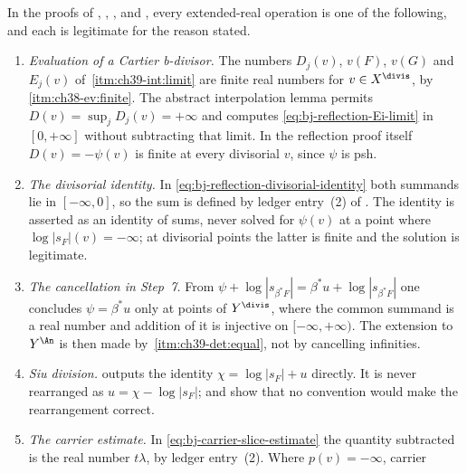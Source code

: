 \begin{proposition}
\label{prop:ch39-safeguards}
In the proofs of ,
,
,
 and
, every extended-real operation is one of
the following, and each is legitimate for the reason stated.
\begin{enumerate}
\item\label{itm:ch39-safe:eval}
 \emph{Evaluation of a Cartier b-divisor.}  The numbers $D_j(v)$,
 $v(F)$, $v(G)$ and $E_j(v)$ of
 \,\cref{itm:ch39-int:limit} are finite real
 numbers for $v\in X^{\divis}$, by
 \,\cref{itm:ch38-ev:finite}.  The abstract
 interpolation lemma permits $D(v)=\sup_jD_j(v)=+\infty$ and computes
 \eqref{eq:bj-reflection-Ei-limit} in $[0,+\infty]$ without subtracting
 that limit.  In the reflection proof itself $D(v)=-\psi(v)$ is finite
 at every divisorial $v$, since $\psi$ is psh.
\item\label{itm:ch39-safe:sum}
 \emph{The divisorial identity.}  In
 \eqref{eq:bj-reflection-divisorial-identity} both summands lie in
 $[-\infty,0]$, so the sum is defined by ledger entry~(2) of
 .  The identity is asserted as an identity of
 sums, never solved for $\psi(v)$ at a point where
 $\log|s_F|(v)=-\infty$; at divisorial points the latter is finite and the
 solution is legitimate.
\item\label{itm:ch39-safe:cancel}
 \emph{The cancellation in Step~7.}  From
 $\psi+\log|s_{\beta^*F}|=\beta^*u+\log|s_{\beta^*F}|$ one concludes
 $\psi=\beta^*u$ only at points of $Y^{\divis}$, where the common
 summand is a real number and addition of it is injective on
 $[-\infty,+\infty)$.  The extension to $Y^{\An}$ is then made by
 \,\cref{itm:ch39-det:equal}, not by
 cancelling infinities.
\item\label{itm:ch39-safe:siu}
 \emph{Siu division.}   outputs the
 identity $\chi=\log|s_F|+u$ directly.  It is never rearranged as
 $u=\chi-\log|s_F|$;  and
  show that no convention would make the
 rearrangement correct.
\item\label{itm:ch39-safe:carrier}
 \emph{The carrier estimate.}  In
 \eqref{eq:bj-carrier-slice-estimate} the quantity subtracted is the real
 number $t\lambda$, by ledger entry~(2).  Where $p(v)=-\infty$, carrier

\end{enumerate}
\end{proposition}
